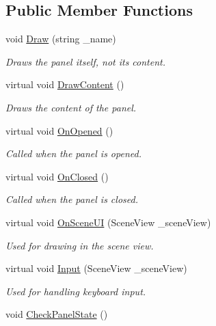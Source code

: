 \subsection*{Public Member Functions}
\begin{DoxyCompactItemize}
\item 
void \hyperlink{class_base_editor_panel_aa06d39bfb1337b3275d76bf6bc098bbe}{Draw} (string \+\_\+name)
\begin{DoxyCompactList}\small\item\em Draws the panel itself, not it\textquotesingle{}s content. \end{DoxyCompactList}\item 
virtual void \hyperlink{class_base_editor_panel_a96ea35bdda7a8e955baa1fd21635bffa}{Draw\+Content} ()
\begin{DoxyCompactList}\small\item\em Draws the content of the panel. \end{DoxyCompactList}\item 
virtual void \hyperlink{class_base_editor_panel_a3a8ccb88e5e34920880e9000a48fb862}{On\+Opened} ()
\begin{DoxyCompactList}\small\item\em Called when the panel is opened. \end{DoxyCompactList}\item 
virtual void \hyperlink{class_base_editor_panel_a88a1951ff16bc1aa4534fb768c0a7c59}{On\+Closed} ()
\begin{DoxyCompactList}\small\item\em Called when the panel is closed. \end{DoxyCompactList}\item 
virtual void \hyperlink{class_base_editor_panel_a720cd4b21ce5c74b52ba310d9978e6e3}{On\+Scene\+UI} (Scene\+View \+\_\+scene\+View)
\begin{DoxyCompactList}\small\item\em Used for drawing in the scene view. \end{DoxyCompactList}\item 
virtual void \hyperlink{class_base_editor_panel_a9bd01437be0e246418dc89209ef2125b}{Input} (Scene\+View \+\_\+scene\+View)
\begin{DoxyCompactList}\small\item\em Used for handling keyboard input. \end{DoxyCompactList}\item 
void \hyperlink{class_base_editor_panel_ae58c401d801f1b987c5314a9195d8f2c}{Check\+Panel\+State} ()

\end{DoxyCompactItemize}
